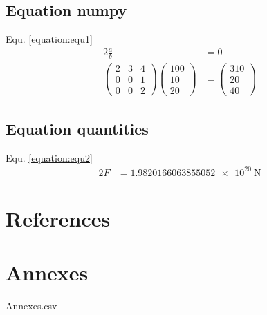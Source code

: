 \documentclass{article}%
\begin{document}
%
\subsection{Equation numpy}%
\label{subsec:Equationnumpy}%
Equ. \ref{equation:equ1}%
\begin{alignat}{2}%
\frac{a}{b} &= 0 \\%
\begin{pmatrix}%
2&3&4\\%
0&0&1\\%
0&0&2%
\end{pmatrix}%
\begin{pmatrix}%
100\\%
10\\%
20%
\end{pmatrix}%
&=%
\begin{pmatrix}%
310\\%
20\\%
40%
\end{pmatrix}%
\label{equation:equ1}%
\end{alignat}

%
\subsection{Equation quantities}%
\label{subsec:Equationquantities}%
Equ. \ref{equation:equ2}%
\begin{alignat}{2}%
F%
&=%
\SI[round-precision=4,round-mode=figures]{1.9820166063855052e+20}{\newton}%
\label{equation:equ2}%
\end{alignat}

%
\cleardoublepage%
\newpage%
\section*{References}%
\label{sec:References}%
\printbibliography[heading=none]

%
%
\cleardoublepage%
\newpage%
\section*{Annexes}%
\label{sec:Annexes}%
Annexes.csv%
\linebreak

%
%
\cleardoublepage%
\end{document}
